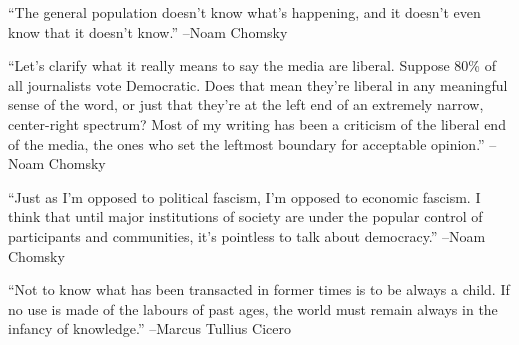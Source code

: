 \documentclass{article}%
\begin{document}
\linebreak%
\vspace{1mm}%
\begin{minipage}{\textwidth}%
\flushleft%
“The general population doesn't know what's happening, and it doesn't even know that it doesn't know.”%
\linebreak%
\vspace{1mm}%
–Noam Chomsky%
\linebreak%
\vspace{1mm}%
\end{minipage}%
\linebreak%
\vspace{1mm}%
\begin{minipage}{\textwidth}%
\flushleft%
“Let's clarify what it really means to say the media are liberal. Suppose 80\% of all journalists vote Democratic. Does that mean they're liberal in any meaningful sense of the word, or just that they're at the left end of an extremely narrow, center{-}right spectrum? Most of my writing has been a criticism of the liberal end of the media, the ones who set the leftmost boundary for acceptable opinion.”%
\linebreak%
\vspace{1mm}%
–Noam Chomsky%
\linebreak%
\vspace{1mm}%
\end{minipage}%
\linebreak%
\vspace{1mm}%
\begin{minipage}{\textwidth}%
\flushleft%
“Just as I'm opposed to political fascism, I'm opposed to economic fascism. I think that until major institutions of society are under the popular control of participants and communities, it's pointless to talk about democracy.”%
\linebreak%
\vspace{1mm}%
–Noam Chomsky%
\linebreak%
\vspace{1mm}%
\end{minipage}%
\linebreak%
\vspace{1mm}%
\begin{minipage}{\textwidth}%
\flushleft%
“Not to know what has been transacted in former times is to be always a child. If no use is made of the labours of past ages, the world must remain always in the infancy of knowledge.”%
\linebreak%
\vspace{1mm}%
–Marcus Tullius Cicero%
\linebreak%
\vspace{1mm}%
\end{minipage}%
\end{document}
